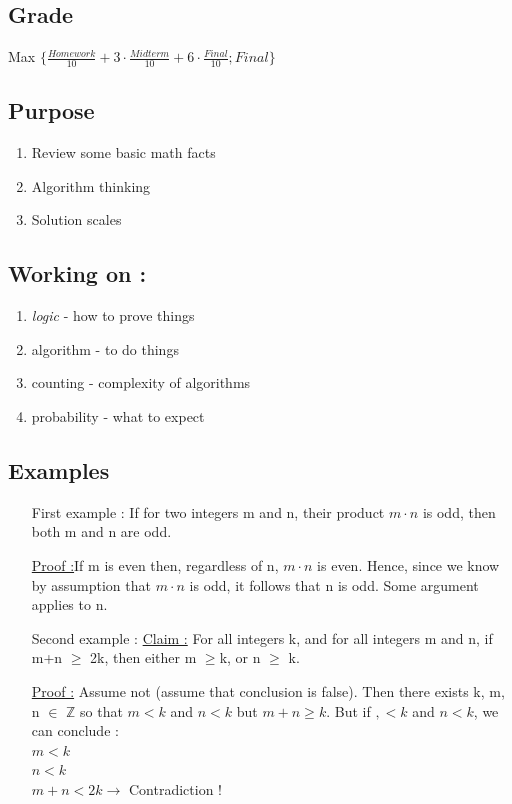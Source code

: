 \documentclass[12pt,a4paper]{article}
\begin{document}
\subsection{Grade} Max $\{\frac{Homework}{10} + 3\cdot\frac{Midterm}{10} + 6\cdot\frac{Final}{10} ; Final\}$\\
\subsection{Purpose}
\begin{enumerate}
	\item Review some basic math facts
	\item Algorithm thinking
	\item Solution scales
\end{enumerate}
\subsection{Working on :}
\begin{enumerate}
	\item \textit{logic} - how to prove things
	\item algorithm - to do things
	\item counting - complexity of algorithms
	\item probability - what to expect
\end{enumerate}
\subsection{Examples}
\begin{itemize}
	\item[First example :] If for two integers m and n, their product $m\cdot n$ is odd, then both m and n are odd.

	\underline{Proof :}If m is even then, regardless of n, $m\cdot n$ is even. Hence, since we know by assumption that $m\cdot n$ is odd, it follows that n is odd. Some argument applies to n.

	\item[Second example :] \underline{Claim :} For all integers k, and for all integers m and n, if m+n $\geq$ 2k, then either m $\geq$k, or n $\geq$ k.

	\underline{Proof :} Assume not (assume that conclusion is false). 		Then there exists k, m, n $\in$ $\pmb{\mathbb{Z}}$ so that $m < k$ and $n < k$ but $m+n \geq k$. But if $, < k$ and $n < k$, we can conclude :
	\\
	$m < k$\\
	$n < k$\\
	$m + n < 2k \rightarrow$ Contradiction !
\end{itemize}
\end{document}
